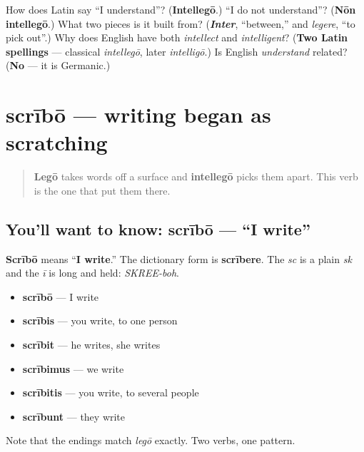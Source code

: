\begin{tcolorbox}[breakable,colback=teal!4,colframe=teal!35!black,title={Before you move on}]
How does Latin say \textquotedblleft{}I understand\textquotedblright{}? (\textbf{Intellegō}.) \textquotedblleft{}I do not understand\textquotedblright{}? (\textbf{Nōn intellegō}.) What two pieces is it built from? (\emph{\textbf{Inter}}, \textquotedblleft{}between,\textquotedblright{} and \emph{legere}, \textquotedblleft{}to pick out\textquotedblright{}.) Why does English have both \emph{intellect} and \emph{intelligent}? (\textbf{Two Latin spellings} — classical \emph{intellegō}, later \emph{intelligō}.) Is English \emph{understand} related? (\textbf{No} — it is Germanic.)
\end{tcolorbox}
\section[scrībō, scrībere]{scrībō — writing began as scratching}

\label{lesson:LA-C38-scribo}



\begin{quote}
\textbf{Legō} takes words off a surface and \textbf{intellegō} picks them apart. This verb is the one that put them there.
\end{quote}

\subsection*{You'll want to know: scrībō — \textquotedblleft{}I write\textquotedblright{}}
\textbf{Scrībō} means \textquotedblleft{}\textbf{I write}.\textquotedblright{} The dictionary form is \textbf{scrībere}. The \emph{sc} is a plain \emph{sk} and the \emph{ī} is long and held: \emph{SKREE-boh}.

\begin{itemize}
\raggedright
  \item \textbf{scrībō} — I write
  \item \textbf{scrībis} — you write, to one person
  \item \textbf{scrībit} — he writes, she writes
  \item \textbf{scrībimus} — we write
  \item \textbf{scrībitis} — you write, to several people
  \item \textbf{scrībunt} — they write
\end{itemize}

Note that the endings match \emph{legō} exactly. Two verbs, one pattern.

